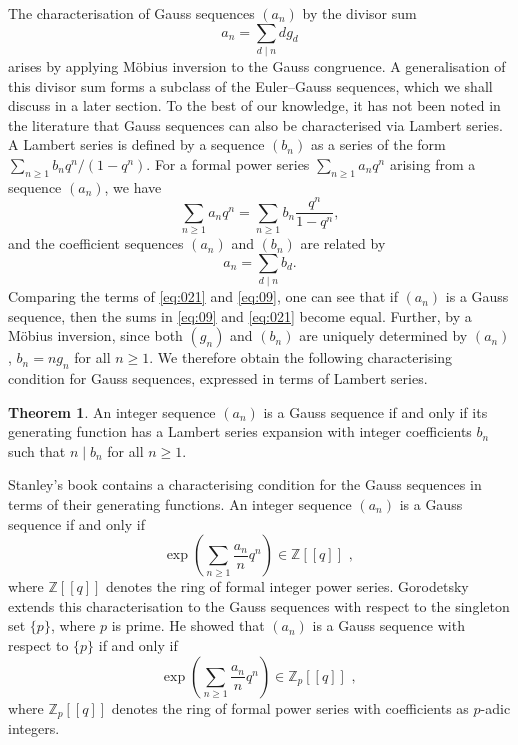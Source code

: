 \documentclass{article}
\numberwithin{equation}{section}
\theoremstyle{definition}
\newtheorem*{theorem*}{Theorem}
\begin{document}
The characterisation of Gauss sequences $(a_n)$ by the divisor sum 
\begin{equation}\label{eq:09}
    a_n=\sum_{d\mid n}dg_d
\end{equation} arises by applying M\"{o}bius inversion to the Gauss congruence. A generalisation of this divisor sum forms a subclass of the Euler--Gauss sequences, which we shall discuss in a later section. To the best of our knowledge, it has not been noted in the literature that Gauss sequences can also be characterised via Lambert series. 
A Lambert series is defined by a sequence $(b_{n})$ as a series of the form
$
\sum_{n\geq 1} b_n q^{n}/(1-q^{n}).
$
For a formal power series $\sum_{n\geq 1} a_n q^n$ arising from a sequence $(a_n)$, we have
\[
\sum_{n\geq 1} a_n q^n = \sum_{n\geq 1} b_n \frac{q^n}{1 - q^n},
\]
and the coefficient sequences $(a_n)$ and $(b_n)$ are related by
\begin{equation}\label{eq:021}
    a_n = \sum_{d \mid n} b_d .
\end{equation}
Comparing the terms of \eqref{eq:021} and \eqref{eq:09}, one can see that if $(a_n)$ is a Gauss sequence, then the sums in \eqref{eq:09} and \eqref{eq:021} become equal. Further, by a M\"{o}bius inversion, since both $(g_n)$ and $(b_n)$ are uniquely determined by $(a_n)$, $b_{n}=ng_{n}$ for all $n\geq 1$. We therefore obtain the following characterising condition for Gauss sequences, expressed in terms of Lambert series.  

\begin{theorem*}
 An integer sequence $(a_n)$ is a Gauss sequence if and only if its generating function has a Lambert series expansion with integer coefficients $b_n$ such that $n\mid b_n$ for all $n\geq 1$. 
\end{theorem*}
     

Stanley's book \cite{stanley_2} contains a characterising condition for the Gauss sequences in terms of their generating functions. An integer sequence $(a_n)$ is a Gauss sequence if and only if
\begin{equation}\label{eq:08}
\exp\left({\sum_{n\geq1}\frac{a_n}{n}q^n}\right)\in\mathbb{Z}[[q]]\text{ , }
\end{equation}
where $\mathbb{Z}[[q]]$ denotes the ring of formal integer power series. Gorodetsky extends this characterisation to the Gauss sequences with respect to the singleton set $\{p\}$, where $p$ is prime. He showed that $(a_n)$ is a Gauss sequence with respect to $\{p\}$ if and only if 
\[\exp\left(\sum_{n\geq1}\frac{a_n}{n}q^n\right)\in\mathbb{Z}_p[[q]]\text{ , }\] where $\mathbb{Z}_p[[q]]$ denotes the ring of formal power series with coefficients as $p$-adic integers. 
 
\end{document}
